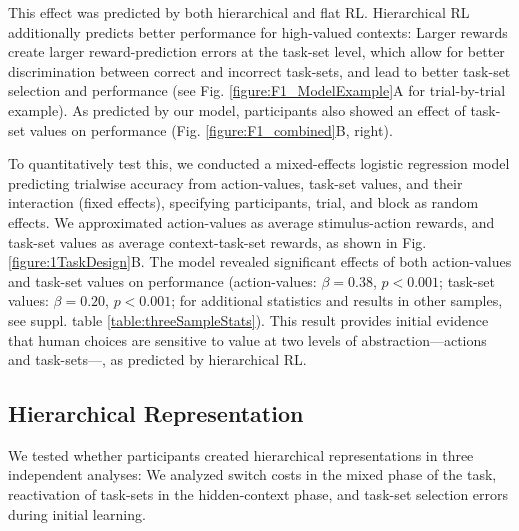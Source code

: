 \documentclass[10pt,letterpaper]{article}  %
\begin{document}
This effect was predicted by both hierarchical and flat RL. Hierarchical RL additionally predicts better performance for high-valued contexts: Larger rewards create larger reward-prediction errors at the task-set level, which allow for better discrimination between correct and incorrect task-sets, and lead to better task-set selection and performance (see Fig. \ref{figure:F1_ModelExample}A for trial-by-trial example). As predicted by our model, participants also showed an effect of task-set values on performance (Fig. \ref{figure:F1_combined}B, right).

To quantitatively test this, we conducted a mixed-effects logistic regression model predicting trialwise accuracy from action-values, task-set values, and their interaction (fixed effects), specifying participants, trial, and block as random effects. We approximated action-values as average stimulus-action rewards, and task-set values as average context-task-set rewards, as shown in Fig. \ref{figure:1TaskDesign}B.
The model revealed significant effects of both action-values and task-set values on performance (action-values: $\beta=0.38$, $p<0.001$; task-set values: $\beta=0.20$, $p<0.001$; for additional statistics and results in other samples, see suppl. table \ref{table:threeSampleStats}).
This result provides initial evidence that human choices are sensitive to value at two levels of abstraction---actions and task-sets---, as predicted by hierarchical RL.

\subsection*{Hierarchical Representation}
\label{section:AcquisitionTaskSets}
We tested whether participants created hierarchical representations in three independent analyses: We analyzed switch costs in the mixed phase of the task, reactivation of task-sets in the hidden-context phase, and task-set selection errors during initial learning. 
\end{document}

